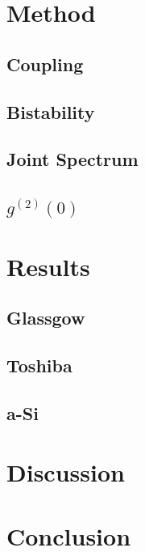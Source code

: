\documentclass[11pt]{article}
\begin{document}
\section{Method}
\subsection{Coupling}
\subsection{Bistability}
\subsection{Joint Spectrum}
\subsection{$g^{(2)}(0)$}
\section{Results}
\subsection{Glassgow}
\subsection{Toshiba}
\subsection{a-Si}
\section{Discussion}
\section{Conclusion}
%


\newpage
\appendix 


\end{document}
